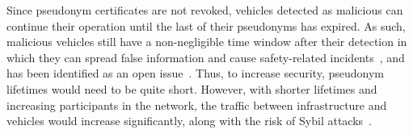 Since pseudonym certificates are not revoked, vehicles detected as malicious can
continue their operation until the last of their pseudonyms has expired. As
such, malicious vehicles still have a non-negligible time window after their
detection in which they can spread false information and cause safety-related
incidents~\cite{etsi2018tr04103415}, and has been identified as an open
issue~\cite{yoshizawa2022v2x_survey}. Thus, to increase security, pseudonym
lifetimes would need to be quite short. However, with shorter lifetimes and
increasing participants in the network, the traffic between infrastructure and
vehicles would increase significantly, along with the risk of Sybil
attacks~\cite{douceur2002sybil}.
%
%
%

